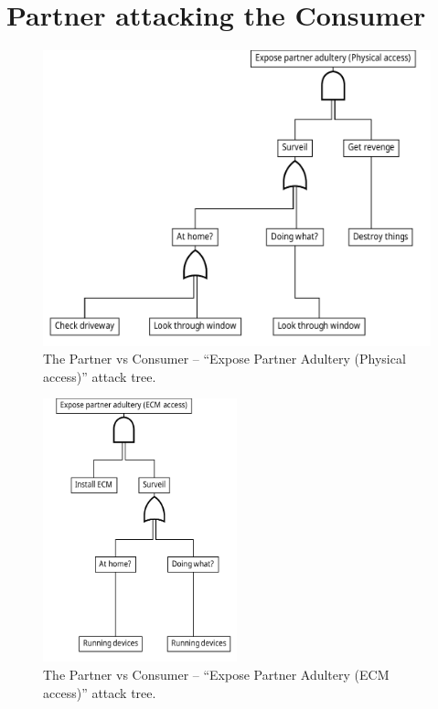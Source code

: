 
\section{Partner attacking the Consumer}
\begin{figure}[h]
  \centering
	\includegraphics[width=.75\textwidth]{figures/graphviz/partner_vs_consumer_physical.pdf}
	\caption{The Partner vs Consumer -- ``Expose Partner Adultery (Physical access)'' attack tree.}
	\label{fig:attack_trees:partner:cheater_physical}
\end{figure}

\begin{figure}[h]
  \centering
  \includegraphics[width=0.5\textwidth]{figures/graphviz/partner_vs_consumer_ecm.pdf}
  \caption{The Partner vs Consumer -- ``Expose Partner Adultery (ECM access)'' attack tree.}
  \label{fig:attack_trees:partner:cheater_ecm}
\end{figure}

